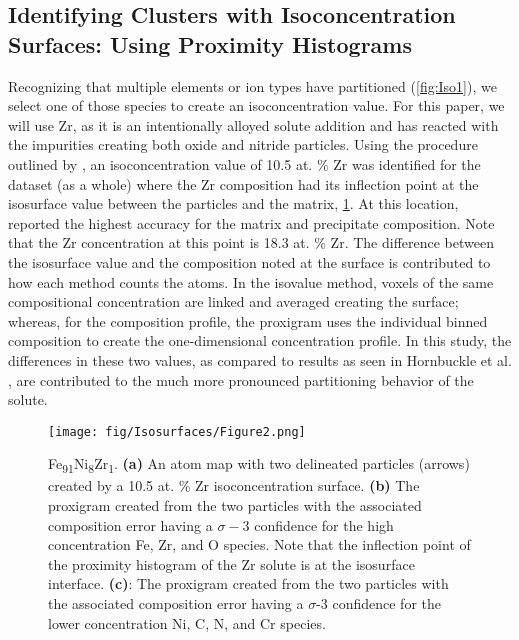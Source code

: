 	\subsection*{Identifying Clusters with Isoconcentration Surfaces: Using Proximity Histograms}
	\label{Identifying Clusters with Isoconcentration Surfaces: Using Proximity Histograms}
		Recognizing that multiple elements or ion types have partitioned (\ref{fig:Iso1}), we select one of those species to create an isoconcentration value. For this paper, we will use Zr, as it is an intentionally alloyed solute addition and has reacted with the impurities creating both oxide and nitride particles. Using the procedure outlined by \cite{RN214}, an isoconcentration value of 10.5 at. \% Zr was identified for the dataset (as a whole) where the Zr composition had its inflection point at the isosurface value between the particles and the matrix, \ref{fig:Iso2}. At this location, \cite{RN214} reported the highest accuracy for the matrix and precipitate composition. Note that the Zr concentration at this point is 18.3 at. \% Zr. The difference between the isosurface value and the composition noted at the surface is contributed to how each method counts the atoms. In the isovalue method, voxels of the same compositional concentration are linked and averaged creating the surface; whereas, for the composition profile, the proxigram uses the individual binned composition to create the one-dimensional concentration profile. In this study, the differences in these two values, as compared to results as seen in Hornbuckle et al. \cite{RN214}, are contributed to the much more pronounced partitioning behavior of the solute.

		\begin{figure}
			\centering
			\texttt{[image: fig/Isosurfaces/Figure2.png]}
			\caption[Atom probe of Fe\textsubscript{91}Ni\textsubscript{8}Zr\textsubscript{1}.]{Fe\textsubscript{91}Ni\textsubscript{8}Zr\textsubscript{1}. \textbf{(a)} An atom map with two delineated particles (arrows) created by a
				10.5 at. \% Zr isoconcentration surface. \textbf{(b)} The proxigram created from the two particles with the associated composition error having a $\sigma-3${} confidence for the high
				concentration Fe, Zr, and O species. Note that the inflection point of the proximity
				histogram of the Zr solute is at the isosurface interface. \textbf{(c)}: The proxigram created
				from the two particles with the associated composition error having a $\sigma$-3 confidence for the lower concentration Ni, C, N, and Cr species.}
			\label{fig:Iso2}
		\end{figure}

